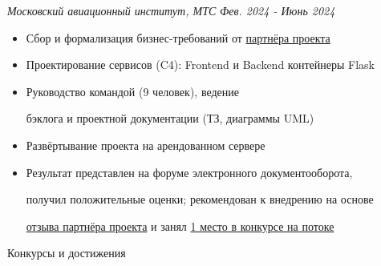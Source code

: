 \documentclass[14pt, a4paper, oneside]{extarticle}
\begin{document}
\begin{flushleft}
	\vspace{-1\intextsep}
	\quad
	\textit{Московский авиационный институт, МТС}
	\hfill
	\textit{\small Фев. 2024 - Июнь 2024}
\end{flushleft}


\begin{itemize}
	\vspace{-2\intextsep}
    \item Сбор и формализация бизнес-требований от \href{https://vk.ru/kearkhipov}{партнёра проекта}
    \vspace{-0.8\intextsep}
    \item Проектирование сервисов (C4): Frontend и Backend контейнеры Flask 
	\vspace{-0.8\intextsep}
    \item Руководство командой (9 человек), ведение 
    
    \vspace{-0.5\intextsep}
    бэклога и проектной документации (ТЗ, диаграммы UML)
    \vspace{-0.8\intextsep}
    \item Развёртывание проекта на арендованном сервере
    \vspace{-0.8\intextsep}
    \item Результат представлен на форуме электронного документооборота,
    
    \vspace{-0.5\intextsep}
    получил положительные оценки; рекомендован к внедрению на основе
    
    \vspace{-0.5\intextsep}
 	\href{https://github.com/Crazy5202/job_application_form/tree/main/portfolio/EDMS/%D0%9E%D1%82%D0%B7%D1%8B%D0%B2_%D0%B2%D0%BD%D0%B5%D0%B4%D1%80%D0%B5%D0%BD%D0%B8%D0%B5.pdf}{отзыва партнёра проекта} и занял \href{https://github.com/Crazy5202/job_application_form/tree/main/portfolio/EDMS/%D0%9F%D0%BE%D0%B1%D0%B5%D0%B4%D0%B8%D1%82%D0%B5%D0%BB%D1%8C_%D0%A6%D0%9A.pdf}{1 место в конкурсе на потоке}
\end{itemize}


\pagebreak


\begin{flushleft}
	\vspace{-\intextsep}
	\large Конкурсы и достижения
\end{flushleft}
\end{document}
